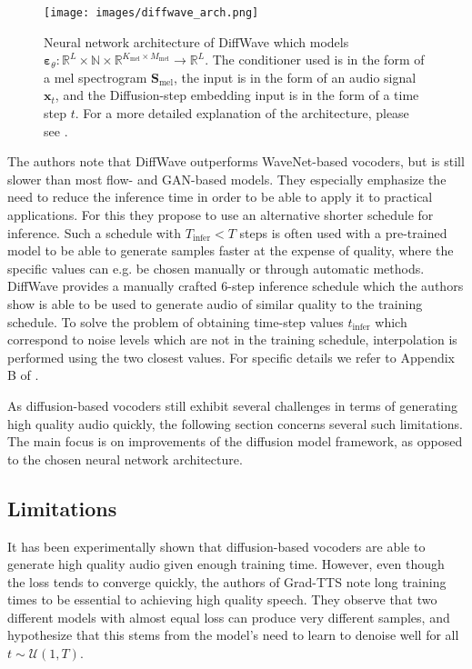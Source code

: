 \documentclass{report}
\begin{document}
\begin{figure}[H]
    \centering
    \texttt{[image: images/diffwave\_arch.png]}
    \caption{\onehalfspacing Neural network architecture of DiffWave which models $\bm{\varepsilon}_{\theta}: \mathbb{R}^L \times \mathbb{N} \times\mathbb{R}^{K_{\text{mel}} \times M_{\text{mel}}} \to \mathbb{R}^L$. The conditioner used is in the form of a mel spectrogram $\bm{S}_{\text{mel}}$, the input is in the form of an audio signal $\bm{x}_t$, and the Diffusion-step embedding input is in the form of a time step $t$. For a more detailed explanation of the architecture, please see \cite{kong2020diffwave}.}
    \label{fig:diffwavearch}
\end{figure}

The authors note that DiffWave outperforms WaveNet-based vocoders, but is still slower than most flow- and GAN-based models. They especially emphasize the need to reduce the inference time in order to be able to apply it to practical applications. For this they propose to use an alternative shorter schedule for inference. Such a schedule with $T_{\text{infer}} < T$ steps is often used with a pre-trained model to be able to generate samples faster at the expense of quality, where the specific values can e.g. be chosen manually or through automatic methods. DiffWave provides a manually crafted 6-step inference schedule which the authors show is able to be used to generate audio of similar quality to the training schedule. To solve the problem of obtaining time-step values $t_{\text{infer}}$ which correspond to noise levels which are not in the training schedule, interpolation is performed using the two closest values. For specific details we refer to Appendix B of \cite{kong2020diffwave}.

As diffusion-based vocoders still exhibit several challenges in terms of generating high quality audio quickly, the following section concerns several such limitations. The main focus is on improvements of the diffusion model framework, as opposed to the chosen neural network architecture.

\subsection{Limitations} \label{sec:limitations}
It has been experimentally shown that diffusion-based vocoders are able to generate high quality audio given enough training time. However, even though the loss tends to converge quickly, the authors of Grad-TTS \cite{popov2021grad} note long training times to be essential to achieving high quality speech. They observe that two different models with almost equal loss can produce very different samples, and hypothesize that this stems from the model's need to learn to denoise well for all $t \sim \mathcal{U}(1, T)$.
\end{document}
